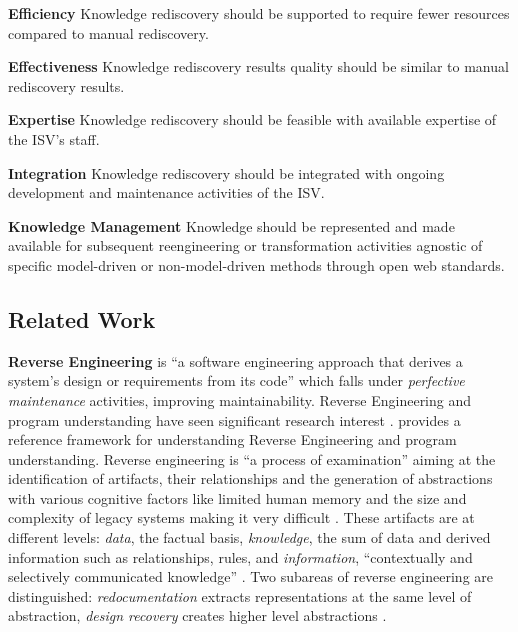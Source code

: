 \textbf{Efficiency} Knowledge rediscovery should be supported to require fewer resources compared to manual rediscovery.

\textbf{Effectiveness} Knowledge rediscovery results quality should be similar to manual rediscovery results.

\textbf{Expertise} Knowledge rediscovery should be feasible with available expertise of the ISV's staff.

\textbf{Integration} Knowledge rediscovery should be integrated with ongoing development and maintenance activities of the ISV.

\textbf{Knowledge Management} Knowledge should be represented and made available for subsequent reengineering or transformation activities agnostic of specific model-driven or non-model-driven methods through open web standards.

\hypertarget{sec:re.related}{%
\subsection{Related Work}\label{sec:re.related}}

\textbf{Reverse Engineering} is ``a software engineering approach that derives a system's design or requirements from its code'' \autocite{ISO/IEEE24765Vocabulary} which falls under \emph{perfective maintenance} \autocite{ISO/IEEE2006SoftwareLifeCycle} activities, improving maintainability.
Reverse Engineering and program understanding have seen significant research interest \autocite{Canfora2007ReverseEngineering}.
\autocite{Tilley1996ProgramUnderstanding} provides a reference framework for understanding Reverse Engineering and program understanding.
Reverse engineering is ``a process of examination'' aiming at the identification of artifacts, their relationships and the generation of abstractions \autocite{SWEBOK2014} with various cognitive factors like limited human memory and the size and complexity of legacy systems making it very difficult \autocite{Tilley1996ProgramUnderstanding}.
These artifacts are at different levels: \emph{data}, the factual basis, \emph{knowledge}, the sum of data and derived information such as relationships, rules, and \emph{information}, ``contextually and selectively communicated knowledge'' \autocite{Tilley1996ProgramUnderstanding}.
Two subareas of reverse engineering are distinguished: \emph{redocumentation} extracts representations at the same level of abstraction, \emph{design recovery} creates higher level abstractions \autocite{Chikofsky1990ReverseEngineering}.

